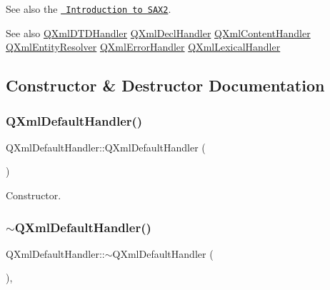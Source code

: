 See also the \href{xml.html\#introSAX2}{\texttt{ Introduction to S\+A\+X2}}.

\begin{DoxySeeAlso}{See also}
\mbox{\hyperlink{class_q_xml_d_t_d_handler}{Q\+Xml\+D\+T\+D\+Handler}} \mbox{\hyperlink{class_q_xml_decl_handler}{Q\+Xml\+Decl\+Handler}} \mbox{\hyperlink{class_q_xml_content_handler}{Q\+Xml\+Content\+Handler}} \mbox{\hyperlink{class_q_xml_entity_resolver}{Q\+Xml\+Entity\+Resolver}} \mbox{\hyperlink{class_q_xml_error_handler}{Q\+Xml\+Error\+Handler}} \mbox{\hyperlink{class_q_xml_lexical_handler}{Q\+Xml\+Lexical\+Handler}} 
\end{DoxySeeAlso}


\subsection{Constructor \& Destructor Documentation}
\mbox{\label{class_q_xml_default_handler_a97addb49dd76cb81b223c45e381f3933}} 
\subsubsection{\texorpdfstring{QXmlDefaultHandler()}{QXmlDefaultHandler()}}
{\footnotesize\ttfamily Q\+Xml\+Default\+Handler\+::\+Q\+Xml\+Default\+Handler (\begin{DoxyParamCaption}{ }\end{DoxyParamCaption})\hspace{0.3cm}{\ttfamily [inline]}}

Constructor. \mbox{\label{class_q_xml_default_handler_a6b048432047efce5fcdd88855e95c3b9}} 
\subsubsection{\texorpdfstring{$\sim$QXmlDefaultHandler()}{~QXmlDefaultHandler()}}
{\footnotesize\ttfamily Q\+Xml\+Default\+Handler\+::$\sim$\+Q\+Xml\+Default\+Handler (\begin{DoxyParamCaption}{ }\end{DoxyParamCaption})\hspace{0.3cm}{\ttfamily [inline]}, {\ttfamily [virtual]}}

